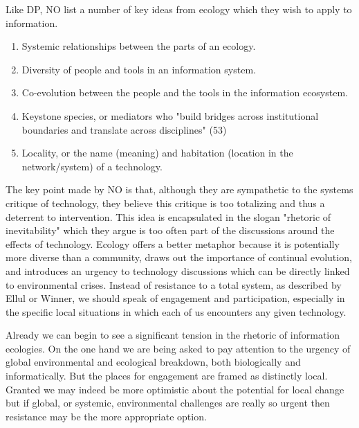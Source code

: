 Like DP, NO list a number of key ideas from ecology which they wish to apply to information.

\begin{enumerate}
\item Systemic relationships between the parts of an ecology.
\item Diversity of people and tools in an information system.
\item Co-evolution between the people and the tools in the information ecosystem.
\item Keystone species, or mediators who "build bridges across institutional boundaries and translate across disciplines" (53)
\item Locality, or the name (meaning) and habitation (location in the network/system) of a technology.
\end{enumerate}

The key point made by NO is that, although they are sympathetic to the systems critique of technology, they believe this critique is too totalizing and thus a deterrent to intervention. This idea is encapsulated in the slogan "rhetoric of inevitability" which they argue is too often part of the discussions around the effects of technology. Ecology offers a better metaphor because it is potentially more diverse than a community, draws out the importance of continual evolution, and introduces an urgency to technology discussions which can be directly linked to environmental crises. Instead of resistance to a total system, as described by Ellul or Winner, we should speak of engagement and participation, especially in the specific local situations in which each of us encounters any given technology.

Already we can begin to see a significant tension in the rhetoric of information ecologies. On the one hand we are being asked to pay attention to the urgency of global environmental and ecological breakdown, both biologically and informatically. But the places for engagement are framed as distinctly local. Granted we may indeed be more optimistic about the potential for local change but if global, or systemic, environmental challenges are really so urgent then resistance may be the more appropriate option.

